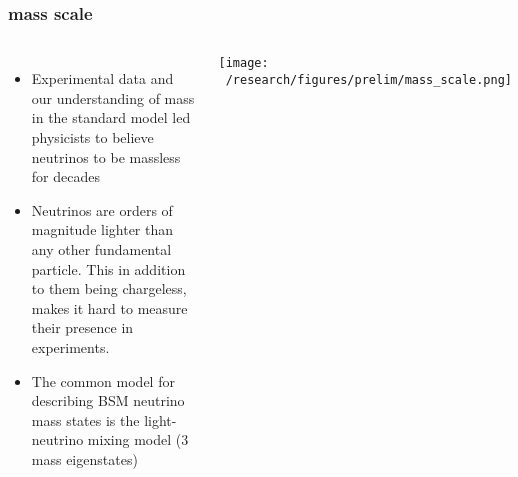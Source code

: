 \documentclass{beamer}
\begin{document}
	\begin{frame}
		\frametitle{mass scale}
		\begin{columns}[c] %
			
			\begin{itemize}
				\setlength\itemsep{2em}
				\item Experimental data and our understanding of mass in the standard model led physicists to believe neutrinos to be massless for decades
				\item Neutrinos are orders of magnitude lighter than any other fundamental particle. This in addition to them being chargeless, makes it hard to measure their presence in experiments.
				\item The common model for describing BSM neutrino mass states is the light-neutrino mixing model (3 mass eigenstates)
				
				
			\end{itemize}
			
			\texttt{[image: ~/research/figures/prelim/mass\_scale.png]}
		
			
		\end{columns}
	\end{frame}
		
\end{document}
